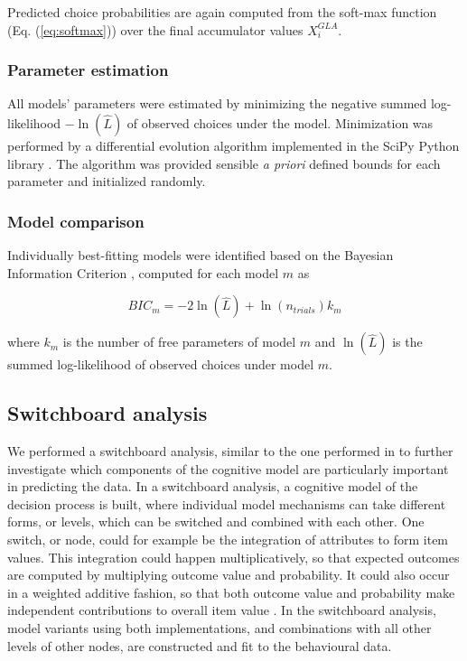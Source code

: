 \documentclass[11pt, a4paper]{article}
\begin{document}
Predicted choice probabilities are again computed from the soft-max function (Eq. (\ref{eq:softmax})) over the final accumulator values $X_i^{GLA}$.

\subsubsection*{Parameter estimation}

All models' parameters were estimated by minimizing the negative summed log-likelihood $-\ln{(\hat{L})}$ of observed choices under the model. Minimization was performed by a differential evolution algorithm \parencite{storn1997DifferentialEvolutionSimple} implemented in the SciPy Python library \parencite[][version 1.2.1]{jones2001SciPyOpenSource}. The algorithm was provided sensible \emph{a priori} defined bounds for each parameter and initialized randomly.

\subsubsection*{Model comparison}

Individually best-fitting models were identified based on the Bayesian Information Criterion \parencite[BIC;][]{schwarz1978EstimatingDimensionModel}, computed for each model $m$ as

\begin{equation}
    \label{eq:bic}
    BIC_m = -2 \ln{(\hat{L})} + \ln{(n_{trials})} k_m
\end{equation}

where $k_m$ is the number of free parameters of model $m$ and $\ln{(\hat{L})}$ is the summed log-likelihood of observed choices under model $m$.

\subsection*{Switchboard analysis}
\label{sec:methods:switchboard}

We performed a switchboard analysis, similar to the one performed in \textcite{turner2018CompetingTheoriesMultialternative} to further investigate which components of the cognitive model are particularly important in predicting the data. In a switchboard analysis, a cognitive model of the decision process is built, where individual model mechanisms can take different forms, or levels, which can be switched and combined with each other. One switch, or node, could for example be the integration of attributes to form item values. This integration could happen multiplicatively, so that expected outcomes are computed by multiplying outcome value and probability. It could also occur in a weighted additive fashion, so that both outcome value and probability make independent contributions to overall item value \parencite[see][, for example]{rouault2019PrefrontalMechanismsCombining}. In the switchboard analysis, model variants using both implementations, and combinations with all other levels of other nodes, are constructed and fit to the behavioural data.
\end{document}
